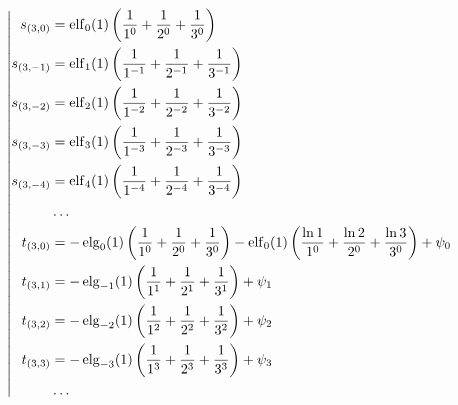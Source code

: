 \begin{equation*} \left| \begin{aligned}
s_{(3,0)} &=
  \elf_0(1) \left(
  \frac{1}{1^0}
+ \frac{1}{2^0}
+ \frac{1}{3^0} \right) \\
%
s_{(3,-1)} &=
  \elf_1(1) \left(
  \frac{1}{1^{-1}}
+ \frac{1}{2^{-1}}
+ \frac{1}{3^{-1}} \right) \\
%
s_{(3,-2)} &=
  \elf_2(1) \left(
  \frac{1}{1^{-2}}
+ \frac{1}{2^{-2}}
+ \frac{1}{3^{-2}} \right) \\
%
s_{(3,-3)} &=
  \elf_3(1) \left(
  \frac{1}{1^{-3}}
+ \frac{1}{2^{-3}}
+ \frac{1}{3^{-3}} \right) \\
%
s_{(3,-4)} &=
  \elf_4(1) \left(
  \frac{1}{1^{-4}}
+ \frac{1}{2^{-4}}
+ \frac{1}{3^{-4}} \right) \\
%
&\ldots \\
%
t_{(3,0)} &=
- \elg_0(1) \left(
  \frac{1}{1^0}
+ \frac{1}{2^0}
+ \frac{1}{3^0} \right)
- \elf_0(1) \left(
  \frac{\ln{1}}{1^0}
+ \frac{\ln{2}}{2^0}
+ \frac{\ln{3}}{3^0} \right)
+ \psi_0 \\
%
t_{(3,1)} &=
- \elg_{-1}(1) \left(
  \frac{1}{1^1}
+ \frac{1}{2^1}
+ \frac{1}{3^1} \right)
+ \psi_1 \\
%
t_{(3,2)} &=
- \elg_{-2}(1) \left(
  \frac{1}{1^2}
+ \frac{1}{2^2}
+ \frac{1}{3^2} \right)
+ \psi_2 \\
%
t_{(3,3)} &=
- \elg_{-3}(1) \left(
  \frac{1}{1^3}
+ \frac{1}{2^3}
+ \frac{1}{3^3} \right)
+ \psi_3 \\
%
&\ldots \\
\end{aligned} \right. \end{equation*}
%
